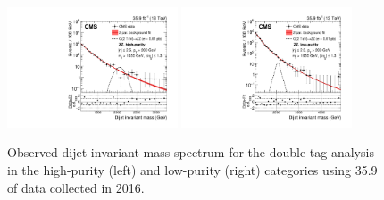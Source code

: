 \begin{figure}[h!]
\includegraphics[width=0.45\textwidth]{figures/analysis/search2/B2G-17-001/Figure_004-e.pdf}
\includegraphics[width=0.45\textwidth]{figures/analysis/search2/B2G-17-001/Figure_004-f.pdf}
\caption{Observed dijet invariant mass spectrum for the double-tag analysis in the high-purity (left) and low-purity (right) categories using 35.9 \fbinv of data collected in 2016.}
\label{fig:searchII:doubleobsmvv_full}
\end{figure}
